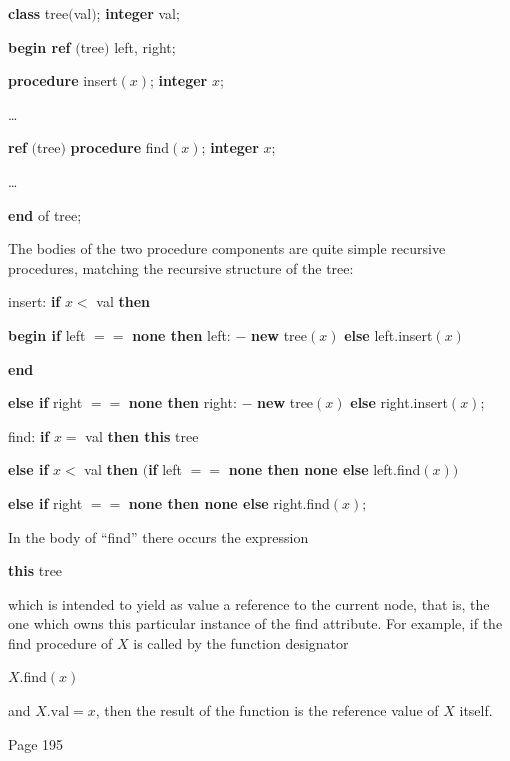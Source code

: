 \quad \textbf{class} tree$($val$)$; \textbf{integer} val;

\quad \quad \textbf{begin ref} $($tree$)$ left, right;

\quad \quad \quad \textbf{procedure} insert$(x)$; \textbf{integer} $x$;

\quad \quad \quad \quad \dots

\quad \quad \quad \textbf{ref} $($tree$)$ \textbf{procedure} find$(x)$; \textbf{integer} $x$;

\quad \quad \quad \quad \dots

\quad \quad \textbf{end} of tree;

The bodies of the two procedure components are quite simple recursive procedures, matching the recursive structure of the tree:

\quad insert: \textbf{if} $x <$ val \textbf{then}

\quad \quad \textbf{begin if} left $==$ \textbf{none then} left: $-$ \textbf{new} tree$(x)$ \textbf{else} left.insert$(x)$

\quad \quad \textbf{end}

\quad \textbf{else if} right $==$ \textbf{none then} right: $-$ \textbf{new} tree$(x)$ \textbf{else} right.insert$(x)$;
\smallskip

\quad find: \textbf{if} $x =$ val \textbf{then this} tree

\quad \textbf{else if} $x <$ val \textbf{then} $($\textbf{if} left $==$ \textbf{none then none else} left.find$(x))$

\quad \textbf{else if} right $==$ \textbf{none then none else} right.find$(x);$

\noindent
In the body of ``find'' there occurs the expression

\quad \textbf{this} tree

\noindent
which is intended to yield as value a reference to the current node, that is, the one which owns this particular instance of the find attribute. For example, if the find procedure of $X$ is called by the function designator 

\quad $X.$find$(x)$

\noindent
and $X.\text{val} = x$, then the result of the function is the reference value of $X$ itself.

Page 195




























